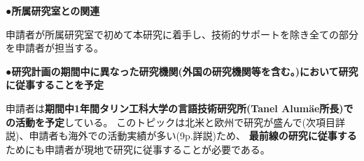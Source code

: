 {	\noindent
	●\textbf{所属研究室との関連}

	申請者が所属研究室で初めて本研究に着手し、技術的サポートを除き全ての部分を申請者が担当する。

	\noindent
	●\textbf{研究計画の期間中に異なった研究機関(外国の研究機関等を含む。)において研究に従事することを予定}
	
	申請者は\textbf{期間中1年間タリン工科大学の言語技術研究所(Tanel Alumäe所長)での活動を予定}している。
	このトピックは北米と欧州で研究が盛んで(次項目詳説)、申請者も海外での活動実績が多い(9p.詳説)ため、
	\textbf{最前線の研究に従事する}ためにも申請者が現地で研究に従事することが必要である。

}

\newcommand{\人権の保護及び法令等の遵守への対応}{%
	コメント取得を予定してしているSNSはTwitterである。
	Twitter社は2020年3月より学術目的でTwitter APIの利用を自由化しているほか、
	取得したツイートIDを含む情報をデータセットとして公開することも学術目的であれば認められている\cite{twitter_2020}。

	また、先行研究が提供したデータセットを使用する場合は、提供者が示すライセンスやポリシーを遵守する。

	なお、学習済みモデルの公表は平成30年改正著作権法第30条4号により認められている。

	ただし、本研究では主観評価実験としてSNSユーザを対象としたアンケート調査を予定している。
	この調査により収集したデータは、個⼈の特定につながる情報を匿名化した上で解析を⾏い、
	解析結果の公表に際しては、匿名化を⾏ったデータを⽤い、個⼈情報の漏洩防⽌に配慮する。

	{\footnotesize
		\begin{thebibliography}{99}
			\setcounter{enumiv}{11}
			\bibitem{twitter_2020} Twitter開発者ポリシーを分かりやすくアップデート, 2020年3月11日. (最終閲覧日 2020年4月19日) \url{https://blog.twitter.com/developer/ja_jp/topics/tools/2020/DevPolicyUpdate.html}
		\end{thebibliography}
	}
}

